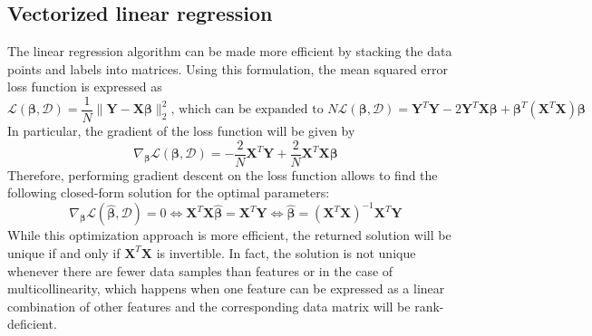 \documentclass{report}
\begin{document}
\subsection{Vectorized linear regression}
The linear regression algorithm can be made more efficient by stacking the data points and labels into matrices. \newline
Using this formulation, the mean squared error loss function is expressed as
\[\mathcal{L}(\mathbf{\beta}, \mathcal{D}) = \frac{1}{N}\lVert \mathbf{Y} - \mathbf{X\beta} \rVert_2^2 \text{, which can be expanded to } N\mathcal{L}(\mathbf{\beta}, \mathcal{D}) = \mathbf{Y}^T\mathbf{Y} - 2\mathbf{Y}^T\mathbf{X\beta} + \mathbf{\beta}^T(\mathbf{X}^T\mathbf{X})\mathbf{\beta}\]
In particular, the gradient of the loss function will be given by
\[\nabla_{\mathbf{\beta}}\mathcal{L}(\mathbf{\beta}, \mathcal{D}) = -\frac{2}{N}\mathbf{X}^T\mathbf{Y} + \frac{2}{N}\mathbf{X}^T\mathbf{X{\beta}}\]
Therefore, performing gradient descent on the loss function allows to find the following closed-form solution for the optimal parameters:
\[\nabla_{\mathbf{\beta}}\mathcal{L}(\hat{\mathbf{\beta}}, \mathcal{D}) = 0 \Leftrightarrow \mathbf{X}^T\mathbf{X\hat{\beta}} = \mathbf{X}^T\mathbf{Y} \Leftrightarrow \hat{\mathbf{\beta}} = (\mathbf{X}^T\mathbf{X})^{-1}\mathbf{X}^T\mathbf{Y}\]
While this optimization approach is more efficient, the returned solution will be unique if and only if $\displaystyle \mathbf{X}^T\mathbf{X}$ is invertible. \newline
In fact, the solution is not unique whenever there are fewer data samples than features or in the case of multicollinearity, which happens when one feature can be expressed as a linear combination of other features and the corresponding data matrix will be rank-deficient.
\end{document}
